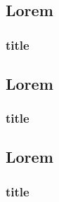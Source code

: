 \documentclass[11pt,a4paper]{report}
\begin{document}
		\setcounter{chapter}{1}
	\chapter{}
	
		\section{Lorem}
	\subsection{title}
	
		\section{Lorem}
	\subsection{title}
	
		\section{Lorem}
	\subsection{title}
	
	
\end{document}

